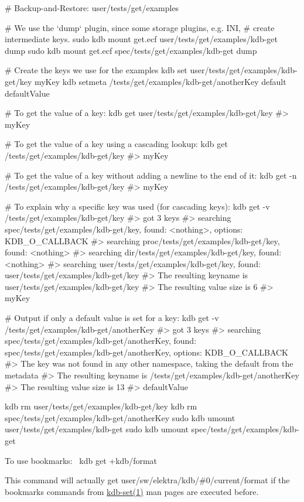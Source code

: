 \begin{DoxyCode}
# Backup-and-Restore: user/tests/get/examples

# We use the `dump` plugin, since some storage plugins, e.g. INI,
# create intermediate keys.
sudo kdb mount get.ecf user/tests/get/examples/kdb-get dump
sudo kdb mount get.ecf spec/tests/get/examples/kdb-get dump

# Create the keys we use for the examples
kdb set user/tests/get/examples/kdb-get/key myKey
kdb setmeta /tests/get/examples/kdb-get/anotherKey default defaultValue

# To get the value of a key:
kdb get user/tests/get/examples/kdb-get/key
#> myKey

# To get the value of a key using a cascading lookup:
kdb get /tests/get/examples/kdb-get/key
#> myKey

# To get the value of a key without adding a newline to the end of it:
kdb get -n /tests/get/examples/kdb-get/key
#> myKey

# To explain why a specific key was used (for cascading keys):
kdb get -v /tests/get/examples/kdb-get/key
#> got 3 keys
#> searching spec/tests/get/examples/kdb-get/key, found: <nothing>, options: KDB\_O\_CALLBACK
#>     searching proc/tests/get/examples/kdb-get/key, found: <nothing>
#>     searching dir/tests/get/examples/kdb-get/key, found: <nothing>
#>     searching user/tests/get/examples/kdb-get/key, found: user/tests/get/examples/kdb-get/key
#> The resulting keyname is user/tests/get/examples/kdb-get/key
#> The resulting value size is 6
#> myKey

# Output if only a default value is set for a key:
kdb get -v /tests/get/examples/kdb-get/anotherKey
#> got 3 keys
#> searching spec/tests/get/examples/kdb-get/anotherKey, found: spec/tests/get/examples/kdb-get/anotherKey,
       options: KDB\_O\_CALLBACK
#> The key was not found in any other namespace, taking the default from the metadata
#> The resulting keyname is /tests/get/examples/kdb-get/anotherKey
#> The resulting value size is 13
#> defaultValue

kdb rm user/tests/get/examples/kdb-get/key
kdb rm spec/tests/get/examples/kdb-get/anotherKey
sudo kdb umount user/tests/get/examples/kdb-get
sudo kdb umount spec/tests/get/examples/kdb-get
\end{DoxyCode}


To use bookmarks\+:~\newline
 {\ttfamily kdb get +kdb/format}

This command will actually get {\ttfamily user/sw/elektra/kdb/\#0/current/format} if the bookmarks commands from \hyperlink{doc_help_kdb-set_md}{kdb-\/set(1)} man pages are executed before.

